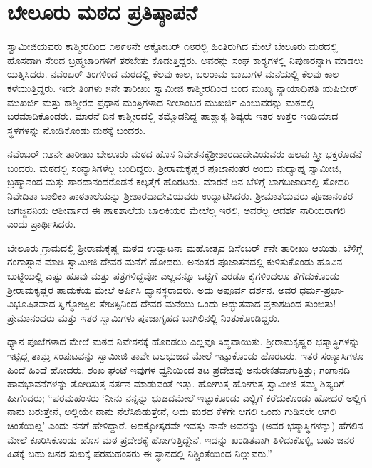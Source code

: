 
\chapter{ಬೇಲೂರು ಮಠದ ಪ್ರತಿಷ್ಠಾಪನೆ}

\vskip 6pt

 ಸ್ವಾಮೀಜಿಯವರು ಕಾಶ್ಮೀರದಿಂದ ೧೮೯೮ನೇ ಅಕ್ಟೋಬರ್ ೧೮ರಲ್ಲಿ ಹಿಂತಿರುಗಿದ ಮೇಲೆ ಬೇಲೂರು ಮಠದಲ್ಲಿ ಹೊಸದಾಗಿ ಸೇರಿದ ಬ್ರಹ್ಮಚಾರಿಗಳಿಗೆ ತರಬೇತು ಕೊಡುತ್ತಿದ್ದರು. ಅವರನ್ನು ಸಂಘ ಕಾರ‍್ಯಗಳಲ್ಲಿ ನಿಪುಣರನ್ನಾಗಿ ಮಾಡಲು ಯತ್ನಿಸಿದರು. ನವೆಂಬರ್ ತಿಂಗಳಿಂದ ಮಠದಲ್ಲಿ ಕೆಲವು ಕಾಲ, ಬಲರಾಮ ಬಾಬುಗಳ ಮನೆಯಲ್ಲಿ ಕೆಲವು ಕಾಲ ಕಳೆಯುತ್ತಿದ್ದರು. ಇದೇ ತಿಂಗಳು ೫ನೇ ತಾರೀಖು ಸ್ವಾಮೀಜಿ ಕಾಶ್ಮೀರದಿಂದ ಬಂದ ಮುಖ್ಯ ನ್ಯಾಯಾಧಿಪತಿ ಋಷಿಬೀರ್ ಮುಖರ್ಜಿ ಮತ್ತು ಕಾಶ್ಮೀರದ ಪ್ರಧಾನ ಮಂತ್ರಿಗಳಾದ ನೀಲಾಂಬರ ಮುಖರ್ಜಿ ಎಂಬುವರನ್ನು ಮಠದಲ್ಲಿ ಬರಮಾಡಿಕೊಂಡರು. ಮಾರನೆ ದಿನ ಕಾಶ್ಮೀರದಲ್ಲಿ ತಮ್ಮೊಡನಿದ್ದ ಪಾಶ್ಚಾತ್ಯ ಶಿಷ್ಯರು ಇತರ ಉತ್ತರ ಇಂಡಿಯಾದ ಸ್ಥಳಗಳನ್ನು ನೋಡಿಕೊಂಡು ಮಠಕ್ಕೆ ಬಂದರು. 

\vskip 2pt

 ನವೆಂಬರ್ ೧೨ನೇ ತಾರೀಖು ಬೇಲೂರು ಮಠದ ಹೊಸ ನಿವೇಶನಕ್ಕೆ\break ಶ‍್ರೀಶಾರದಾದೇವಿಯವರು ಹಲವು ಸ್ತ್ರೀ ಭಕ್ತರೊಡನೆ ಬಂದರು. ಮಠದಲ್ಲಿ ಸಂನ್ಯಾಸಿಗಳೆಲ್ಲ ಬಂದಿದ್ದರು. ಶ‍್ರೀರಾಮಕೃಷ್ಣರ ಪೂಜಾನಂತರ ಅಂದು ಮಧ್ಯಾಹ್ನ ಸ್ವಾಮೀಜಿ, ಬ್ರಹ್ಮಾನಂದ ಮತ್ತು ಶಾರದಾನಂದರೊಡನೆ ಕಲ್ಕತ್ತೆಗೆ ಹೊರಟರು. ಮಾರನೆ ದಿನ ಬೆಳಿಗ್ಗೆ ಬಾಗಬಜಾರಿನಲ್ಲಿ ಸೋದರಿ ನಿವೇದಿತಾ ಬಾಲಿಕಾ ಪಾಠಶಾಲೆಯನ್ನು ಶ‍್ರೀಶಾರದಾದೇವಿ\-ಯವರು ಉದ್ಘಾಟಿಸಿದರು. ಶ‍್ರೀಮಾತೆಯವರು ಪೂಜಾನಂತರ ಜಗಜ್ಜನನಿಯ ಆಶೀರ್ವಾದ ಈ ಪಾಠಶಾಲೆಯ ಬಾಲಕಿಯರ ಮೇಲೆಲ್ಲ ಇರಲಿ, ಅವರೆಲ್ಲ ಆದರ್ಶ ನಾರಿಯರಾಗಲಿ ಎಂದು ಪ್ರಾರ್ಥಿಸಿದರು. 

\vskip 2pt

 ಬೇಲೂರು ಗ್ರಾಮದಲ್ಲಿ ಶ‍್ರೀರಾಮಕೃಷ್ಣ ಮಠದ ಉದ್ಘಾಟನಾ ಮಹೋತ್ಸವ ಡಿಸೆಂಬರ್ ೯ನೇ ತಾರೀಖು ಆಯಿತು. ಬೆಳಿಗ್ಗೆ ಗಂಗಾಸ್ನಾನ ಮಾಡಿ ಸ್ವಾಮೀಜಿ ದೇವರ ಮನೆಗೆ ಹೋದರು. ಅನಂತರ ಪೂಜಾಸನದಲ್ಲಿ ಕುಳಿತುಕೊಂಡು ಹೂವಿನ ಬುಟ್ಟಿಯಲ್ಲಿ ಎಷ್ಟು ಹೂವು ಮತ್ತು ಪತ್ರೆಗಳಿದ್ದವೋ ಎಲ್ಲವನ್ನೂ ಒಟ್ಟಿಗೆ ಎರಡೂ ಕೈಗಳಿಂದಲೂ ತೆಗೆದುಕೊಂಡು ಶ‍್ರೀರಾಮಕೃಷ್ಣರ ಪಾದುಕೆಯ ಮೇಲೆ ಅರ್ಪಿಸಿ ಧ್ಯಾನಸ್ಥರಾದರು. ಅದು ಅಪೂರ್ವ ದರ್ಶನ. ಅವರ ಧರ್ಮ-ಪ್ರಭಾ-ವಿಭೂಷಿತವಾದ ಸ್ನಿಗ್ಧೋಜ್ವಲ ತೇಜಸ್ಸಿನಿಂದ ದೇವರ ಮನೆಯು ಒಂದು ಅದ್ಭುತವಾದ ಪ್ರಕಾಶದಿಂದ ತುಂಬಿತು! ಪ್ರೇಮಾನಂದರು ಮತ್ತು ಇತರ ಸ್ವಾಮಿಗಳು ಪೂಜಾಗೃಹದ ಬಾಗಿಲಿನಲ್ಲಿ ನಿಂತುಕೊಂಡಿದ್ದರು. 

 ಧ್ಯಾನ ಪೂಜೆಗಳಾದ ಮೇಲೆ ಮಠದ ನಿವೇಶನಕ್ಕೆ ಹೊರಡಲು ಎಲ್ಲವೂ ಸಿದ್ಧವಾಯಿತು. ಶ‍್ರೀರಾಮಕೃಷ್ಣರ ಭಸ್ಮಾಸ್ಥಿಗಳನ್ನು ಇಟ್ಟಿದ್ದ ತಾಮ್ರ ಸಂಪುಟವನ್ನು ಸ್ವಾಮೀಜಿ ತಾವೇ ಬಲಭುಜದ ಮೇಲೆ ಇಟ್ಟುಕೊಂಡು ಹೊರಟರು. ಇತರ ಸಂನ್ಯಾಸಿಗಳೂ ಹಿಂದೆ ಹಿಂದೆ ಹೋದರು. ಶಂಖ ಘಂಟೆ ಇವುಗಳ ಧ್ವನಿಯಿಂದ ತಟ ಪ್ರದೇಶವು ಅನುರಣಿತವಾಗುತ್ತಿತ್ತು; ಗಂಗಾನದಿ ಹಾವಭಾವನೆಗಳನ್ನು ತೋರಿಸುತ್ತ ನರ್ತನ ಮಾಡುವಂತೆ ಇತ್ತು. ಹೋಗುತ್ತ ಹೋಗುತ್ತ ಸ್ವಾಮೀಜಿ ತಮ್ಮ ಶಿಷ್ಯರಿಗೆ ಹೀಗೆಂದರು; “ಪರಮಹಂಸರು ‘ನೀನು ನನ್ನನ್ನು ಭುಜದಮೇಲೆ ಇಟ್ಟುಕೊಂಡು ಎಲ್ಲಿಗೆ ಕರೆದುಕೊಂಡು ಹೋದರೆ ಅಲ್ಲಿಗೆ ನಾನು ಬರುತ್ತೇನೆ, ಅಲ್ಲಿಯೇ ನಾನು ನೆಲೆಸಿಬಿಡುತ್ತೇನೆ, ಅದು ಮರದ ಕೆಳಗೇ ಆಗಲಿ ಒಂದು ಗುಡಿಸಲೇ ಆಗಲಿ ಚಿಂತೆಯಿಲ್ಲ’ ಎಂದು ನನಗೆ ಹೇಳಿದ್ದಾರೆ. ಅದಕ್ಕೋಸ್ಕರವೇ ಇವತ್ತು ನಾನೇ ಅವರನ್ನು (ಅವರ ಭಸ್ಮಾಸ್ಥಿಗಳನ್ನು) ಹೆಗಲಿನ ಮೇಲೆ ಕೂರಿಸಿಕೊಂಡು ಹೊಸ ಮಠ ಪ್ರದೇಶಕ್ಕೆ ಹೋಗುತ್ತಿದ್ದೇನೆ. ಇದನ್ನು ಖಂಡಿತವಾಗಿ ತಿಳಿದುಕೊಳ್ಳಿ, ಬಹು ಜನರ ಹಿತಕ್ಕೆ ಬಹು ಜನರ ಸುಖಕ್ಕೆ ಪರಮಹಂಸರು ಈ ಸ್ಥಾನದಲ್ಲಿ ನಿಶ್ಚಿಂತೆಯಿಂದ ನಿಲ್ಲುವರು.” 

